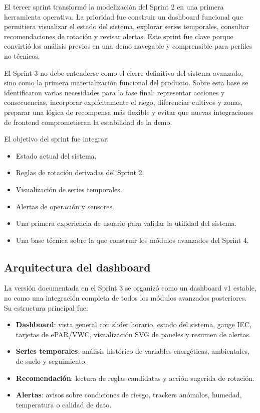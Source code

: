 ﻿\documentclass[11pt,a4paper]{article}
\begin{document}
El tercer sprint transformó la modelización del Sprint 2 en una primera herramienta operativa. La prioridad fue construir un dashboard funcional que permitiera visualizar el estado del sistema, explorar series temporales, consultar recomendaciones de rotación y revisar alertas. Este sprint fue clave porque convirtió los análisis previos en una demo navegable y comprensible para perfiles no técnicos.

El Sprint 3 no debe entenderse como el cierre definitivo del sistema avanzado, sino como la primera materialización funcional del producto. Sobre esta base se identificaron varias necesidades para la fase final: representar acciones y consecuencias, incorporar explícitamente el riego, diferenciar cultivos y zonas, preparar una lógica de recompensa más flexible y evitar que nuevas integraciones de frontend comprometieran la estabilidad de la demo.

El objetivo del sprint fue integrar:

\begin{itemize}
    \item Estado actual del sistema.
    \item Reglas de rotación derivadas del Sprint 2.
    \item Visualización de series temporales.
    \item Alertas de operación y sensores.
    \item Una primera experiencia de usuario para validar la utilidad del sistema.
    \item Una base técnica sobre la que construir los módulos avanzados del Sprint 4.
\end{itemize}
\subsection{Arquitectura del dashboard}

La versión documentada en el Sprint 3 se organizó como un dashboard v1 estable, no como una integración completa de todos los módulos avanzados posteriores. Su estructura principal fue:

\begin{itemize}
    \item \textbf{Dashboard}: vista general con slider horario, estado del sistema, gauge IEC, tarjetas de ePAR/VWC, visualización SVG de paneles y resumen de alertas.
    \item \textbf{Series temporales}: análisis histórico de variables energéticas, ambientales, de suelo y seguimiento.
    \item \textbf{Recomendación}: lectura de reglas candidatas y acción sugerida de rotación.
    \item \textbf{Alertas}: avisos sobre condiciones de riesgo, trackers anómalos, humedad, temperatura o calidad de dato.
\end{itemize}
\end{document}
